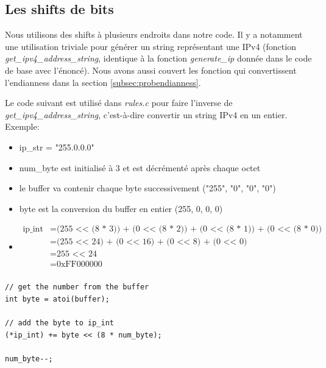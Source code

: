 \documentclass[a4paper]{article}
\begin{document}
\subsection{Les shifts de bits}



Nous utilisons des shifts à plusieurs endroits dans notre code. Il y a notamment une utilisation triviale pour générer un string représentant une IPv4 (fonction \textit{get\_ipv4\_address\_string}, identique à la fonction \textit{generate\_ip} donnée dans le code de base avec l'énoncé). Nous avons aussi couvert les fonction qui convertissent l'endianness dans la section \ref{subsec:probendianness}.

Le code suivant est utilisé dans \textit{rules.c} pour faire l'inverse de \textit{get\_ipv4\_address\_string}, c'est-à-dire convertir un string IPv4 en un entier. Exemple:
\begin{itemize}
    \item ip\_str = "255.0.0.0"
    \item num\_byte est initialisé à 3 et est décrémenté après chaque octet
    \item le buffer va contenir chaque byte successivement ("255", "0", "0", "0")
    \item byte est la conversion du buffer en entier (255, 0, 0, 0)
    \item \[\begin{aligned}
        \text{ip\_int}
        &= \text{(255 <{}< (8 * 3)) + (0 <{}< (8 * 2)) + (0 <{}< (8 * 1)) + (0 <{}< (8 * 0))} \\
        &= \text{(255 <{}< 24) + (0 <{}< 16) + (0 <{}< 8) + (0 <{}< 0)} \\
        &= \text{255 <{}< 24} \\
        &= \text{0xFF000000} \\
    \end{aligned}\]
\end{itemize}

\begin{lstlisting}[style=CStyle]
// get the number from the buffer
int byte = atoi(buffer);

// add the byte to ip_int
(*ip_int) += byte << (8 * num_byte);

num_byte--;
\end{lstlisting}
\end{document}
